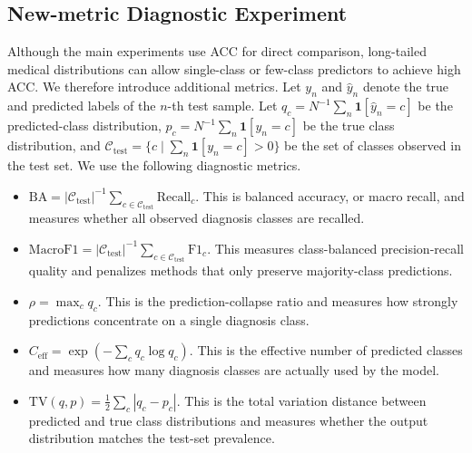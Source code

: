 \documentclass[letterpaper]{article} %
\begin{document}
\subsection{New-metric Diagnostic Experiment}
Although the main experiments use ACC for direct comparison, long-tailed medical distributions can allow single-class or few-class predictors to achieve high ACC. We therefore introduce additional metrics. Let \(y_n\) and \(\hat{y}_n\) denote the true and predicted labels of the \(n\)-th test sample. Let \(q_c=N^{-1}\sum_n\mathbf{1}[\hat{y}_n=c]\) be the predicted-class distribution, \(p_c=N^{-1}\sum_n\mathbf{1}[y_n=c]\) be the true class distribution, and \(\mathcal{C}_{\mathrm{test}}=\{c\mid \sum_n\mathbf{1}[y_n=c]>0\}\) be the set of classes observed in the test set. We use the following diagnostic metrics.

\begin{itemize}
\item \(\mathrm{BA}=|\mathcal{C}_{\mathrm{test}}|^{-1}\sum_{c\in\mathcal{C}_{\mathrm{test}}}\mathrm{Recall}_c\). This is balanced accuracy, or macro recall, and measures whether all observed diagnosis classes are recalled.
\item \(\mathrm{MacroF1}=|\mathcal{C}_{\mathrm{test}}|^{-1}\sum_{c\in\mathcal{C}_{\mathrm{test}}}\mathrm{F1}_c\). This measures class-balanced precision-recall quality and penalizes methods that only preserve majority-class predictions.
\item \(\rho=\max_c q_c\). This is the prediction-collapse ratio and measures how strongly predictions concentrate on a single diagnosis class.
\item \(C_{\mathrm{eff}}=\exp\left(-\sum_c q_c\log q_c\right)\). This is the effective number of predicted classes and measures how many diagnosis classes are actually used by the model.
\item \(\mathrm{TV}(q,p)=\frac{1}{2}\sum_c |q_c-p_c|\). This is the total variation distance between predicted and true class distributions and measures whether the output distribution matches the test-set prevalence.
\end{itemize}
\end{document}

